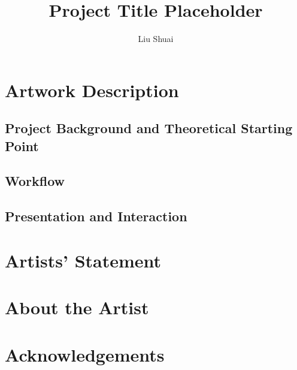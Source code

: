 \documentclass[sigconf,nonacm]{acmart}
\title{Project Title Placeholder}
\author{Liu Shuai}
\affiliation{%
  \institution{Academy of Media Arts Cologne (KHM)}
  \city{Cologne}
  \country{Germany}}
\begin{document}
\begin{abstract}
\end{abstract}

\begin{CCSXML}
\end{CCSXML}


\maketitle

\section{Artwork Description}

\subsection{Project Background and Theoretical Starting Point}

\subsection{Workflow}

\subsection{Presentation and Interaction}

\section{Artists' Statement}

\section{About the Artist}

\section*{Acknowledgements}
\end{document}
